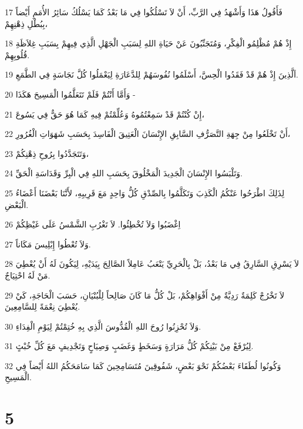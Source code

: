 \par 17 فَأَقُولُ هَذَا وَأَشْهَدُ فِي الرَّبِّ، أَنْ لاَ تَسْلُكُوا فِي مَا بَعْدُ كَمَا يَسْلُكُ سَائِرُ الأُمَمِ أَيْضاً بِبُطْلِ ذِهْنِهِمْ،
\par 18 إِذْ هُمْ مُظْلِمُو الْفِكْرِ، وَمُتَجَنِّبُونَ عَنْ حَيَاةِ اللهِ لِسَبَبِ الْجَهْلِ الَّذِي فِيهِمْ بِسَبَبِ غِلاَظَةِ قُلُوبِهِمْ.
\par 19 اَلَّذِينَ إِذْ هُمْ قَدْ فَقَدُوا الْحِسَّ، أَسْلَمُوا نُفُوسَهُمْ لِلدَّعَارَةِ لِيَعْمَلُوا كُلَّ نَجَاسَةٍ فِي الطَّمَعِ.
\par 20 وَأَمَّا أَنْتُمْ فَلَمْ تَتَعَلَّمُوا الْمَسِيحَ هَكَذَا -
\par 21 إِنْ كُنْتُمْ قَدْ سَمِعْتُمُوهُ وَعُلِّمْتُمْ فِيهِ كَمَا هُوَ حَقٌّ فِي يَسُوعَ،
\par 22 أَنْ تَخْلَعُوا مِنْ جِهَةِ التَّصَرُّفِ السَّابِقِ الإِنْسَانَ الْعَتِيقَ الْفَاسِدَ بِحَسَبِ شَهَوَاتِ الْغُرُورِ،
\par 23 وَتَتَجَدَّدُوا بِرُوحِ ذِهْنِكُمْ،
\par 24 وَتَلْبَسُوا الإِنْسَانَ الْجَدِيدَ الْمَخْلُوقَ بِحَسَبِ اللهِ فِي الْبِرِّ وَقَدَاسَةِ الْحَقِّ.
\par 25 لِذَلِكَ اطْرَحُوا عَنْكُمُ الْكَذِبَ وَتَكَلَّمُوا بِالصِّدْقِ كُلُّ وَاحِدٍ مَعَ قَرِيبِهِ، لأَنَّنَا بَعْضَنَا أَعْضَاءُ الْبَعْضِ.
\par 26 اِغْضَبُوا وَلاَ تُخْطِئُوا. لاَ تَغْرُبِ الشَّمْسُ عَلَى غَيْظِكُمْ
\par 27 وَلاَ تُعْطُوا إِبْلِيسَ مَكَاناً.
\par 28 لاَ يَسْرِقِ السَّارِقُ فِي مَا بَعْدُ، بَلْ بِالْحَرِيِّ يَتْعَبُ عَامِلاً الصَّالِحَ بِيَدَيْهِ، لِيَكُونَ لَهُ أَنْ يُعْطِيَ مَنْ لَهُ احْتِيَاجٌ.
\par 29 لاَ تَخْرُجْ كَلِمَةٌ رَدِيَّةٌ مِنْ أَفْوَاهِكُمْ، بَلْ كُلُّ مَا كَانَ صَالِحاً لِلْبُنْيَانِ، حَسَبَ الْحَاجَةِ، كَيْ يُعْطِيَ نِعْمَةً لِلسَّامِعِينَ.
\par 30 وَلاَ تُحْزِنُوا رُوحَ اللهِ الْقُدُّوسَ الَّذِي بِهِ خُتِمْتُمْ لِيَوْمِ الْفِدَاءِ.
\par 31 لِيُرْفَعْ مِنْ بَيْنِكُمْ كُلُّ مَرَارَةٍ وَسَخَطٍ وَغَضَبٍ وَصِيَاحٍ وَتَجْدِيفٍ مَعَ كُلِّ خُبْثٍ.
\par 32 وَكُونُوا لُطَفَاءَ بَعْضُكُمْ نَحْوَ بَعْضٍ، شَفُوقِينَ مُتَسَامِحِينَ كَمَا سَامَحَكُمُ اللهُ أَيْضاً فِي الْمَسِيحِ.

\chapter{5}

